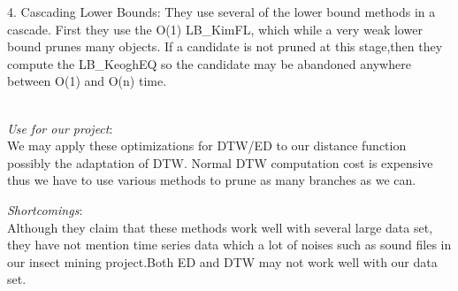 \begin{itemize*}
4. Cascading Lower Bounds: They use several of the lower bound methods in a cascade. First they use the O(1) LB\_KimFL, which while a very weak lower bound prunes many objects. If a candidate is not pruned at this stage,then they compute the LB\_KeoghEQ so the candidate may be abandoned anywhere between O(1) and O(n) time.\\\\
\item {\em Use for our project}:\\
      We may apply these optimizations for DTW/ED to our distance function possibly the adaptation of DTW. Normal DTW computation cost is expensive thus we have to use various methods to prune as many branches as we can.
\item {\em Shortcomings}:\\
      Although they claim that these methods work well with several large data set, they have not mention time series data which a lot of noises such as sound files in our insect mining project.Both ED and DTW may not work well with our data set.
\end{itemize*}

